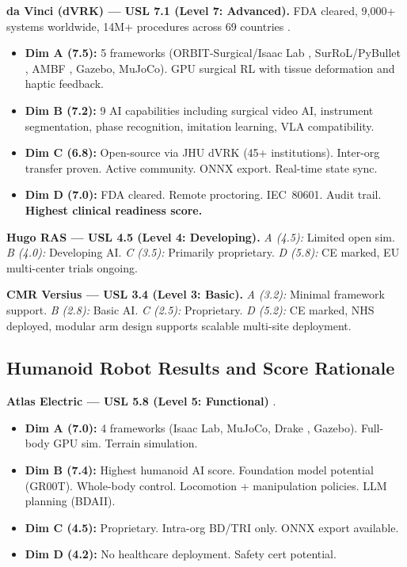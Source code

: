 \textbf{da Vinci (dVRK) --- USL 7.1 (Level 7: Advanced).} FDA cleared, 9,000+ systems worldwide, 14M+ procedures across 69 countries \cite{dvrk2026}.
\begin{itemize}
  \item \textbf{Dim A (7.5):} 5 frameworks (ORBIT-Surgical/Isaac Lab \cite{orbitsurgical2024}, SurRoL/PyBullet \cite{surrol2024}, AMBF \cite{ambf2024}, Gazebo, MuJoCo). GPU surgical RL with tissue deformation and haptic feedback.
  \item \textbf{Dim B (7.2):} 9 AI capabilities including surgical video AI, instrument segmentation, phase recognition, imitation learning, VLA compatibility.
  \item \textbf{Dim C (6.8):} Open-source via JHU dVRK (45+ institutions). Inter-org transfer proven. Active community. ONNX export. Real-time state sync.
  \item \textbf{Dim D (7.0):} FDA cleared. Remote proctoring. IEC~80601. Audit trail. \textbf{Highest clinical readiness score.}
\end{itemize}

\textbf{Hugo RAS --- USL 4.5 (Level 4: Developing).} \textit{A (4.5):} Limited open sim. \textit{B (4.0):} Developing AI. \textit{C (3.5):} Primarily proprietary. \textit{D (5.8):} CE marked, EU multi-center trials ongoing.

\textbf{CMR Versius --- USL 3.4 (Level 3: Basic).} \textit{A (3.2):} Minimal framework support. \textit{B (2.8):} Basic AI. \textit{C (2.5):} Proprietary. \textit{D (5.2):} CE marked, NHS deployed, modular arm design supports scalable multi-site deployment.

\subsection{Humanoid Robot Results and Score Rationale}

\textbf{Atlas Electric --- USL 5.8 (Level 5: Functional)} \cite{atlas2024}.
\begin{itemize}
  \item \textbf{Dim A (7.0):} 4 frameworks (Isaac Lab, MuJoCo, Drake \cite{drake2024}, Gazebo). Full-body GPU sim. Terrain simulation.
  \item \textbf{Dim B (7.4):} Highest humanoid AI score. Foundation model potential (GR00T). Whole-body control. Locomotion + manipulation policies. LLM planning (BDAII).
  \item \textbf{Dim C (4.5):} Proprietary. Intra-org BD/TRI only. ONNX export available.
  \item \textbf{Dim D (4.2):} No healthcare deployment. Safety cert potential.
\end{itemize}

